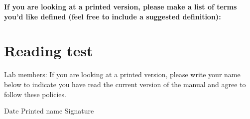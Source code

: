 \documentclass[letterpaper,12pt,oneside]{memoir}
\begin{document}
\vspace{.2in}
\noindent \textbf{\large If you are looking at a printed version, please make a list of terms you'd like defined (feel free to include a suggested definition):}



%
%

\chapter*{Reading test}
\noindent Lab members: If you are looking at a printed version, please write your name below to indicate you have read the current version of the manual and agree to follow these policies.

\vspace{,5in}

\noindent Date \hspace{.5in} Printed name \hspace{1.5in} Signature\\
\end{document}
